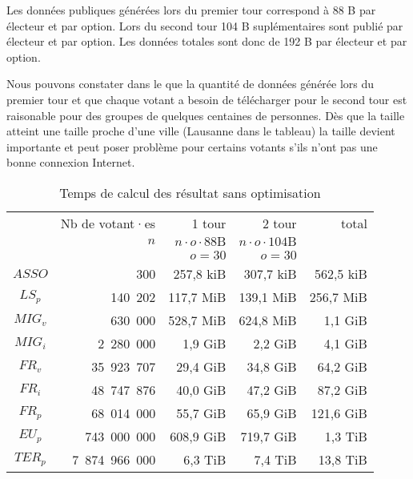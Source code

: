 \documentclass[../report]{subfiles}
\begin{document}
Les données publiques générées lors du premier tour correspond à 88 B par électeur et par option.
Lors du second tour 104 B suplémentaires sont publié par électeur et par option.
Les données totales sont donc de 192 B par électeur et par option.

Nous pouvons constater dans le  que la quantité de données générée lors du premier tour et
que chaque votant a besoin de télécharger pour le second tour est raisonable pour des groupes de quelques centaines de personnes.
Dès que la taille atteint une taille proche d'une ville (Lausanne dans le tableau) la taille devient importante et peut poser
problème pour certains votants s'ils n'ont pas une bonne connexion Internet.


\begin{table}[H]
  \begin{center}
    \begin{tabular}{|c|r|r|r|r|}
      \hline
       & Nb de votant·es      & 1\up{er} tour                & 2\up{nd} tour & total\\
       & $n$                  & $n \cdot o \cdot 88\text{B}$ & $n \cdot o \cdot 104\text{B}$  &  \\
      \hline
       &                      & $o = 30$ & $o = 30$ &                    \\
      \hline
      \hline
      $ASSO$  &           300 & 257,8 kiB & 307,7 kiB & 562,5 kiB \\
      $LS_p$  &       140~202 & 117,7 MiB & 139,1 MiB & 256,7 MiB \\
      $MIG_v$ &       630~000 & 528,7 MiB & 624,8 MiB &   1,1 GiB \\
      $MIG_i$ &     2~280~000 &   1,9 GiB &   2,2 GiB &   4,1 GiB \\
      $FR_v$  &    35~923~707 &  29,4 GiB &  34,8 GiB &  64,2 GiB \\
      $FR_i$  &    48~747~876 &  40,0 GiB &  47,2 GiB &  87,2 GiB \\
      $FR_p$  &    68~014~000 &  55,7 GiB &  65,9 GiB & 121,6 GiB \\
      $EU_p$  &   743~000~000 & 608,9 GiB & 719,7 GiB &   1,3 TiB \\
      $TER_p$ & 7~874~966~000 &   6,3 TiB &   7,4 TiB &  13,8 TiB \\
      \hline
    \end{tabular}
  \end{center}
  \caption{Temps de calcul des résultat sans optimisation}\label{tab:res:perf:size}
\end{table}
\end{document}
